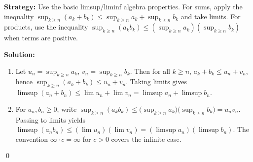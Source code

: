\noindent\textbf{Strategy:} Use the basic limsup/liminf algebra properties. For sums, apply the inequality \(\sup_{k\ge n}(a_k+b_k)\le \sup_{k\ge n} a_k + \sup_{k\ge n} b_k\) and take limits. For products, use the inequality \(\sup_{k\ge n}(a_k b_k)\le (\sup_{k\ge n} a_k)(\sup_{k\ge n} b_k)\) when terms are positive.

\bigskip\noindent\textbf{Solution:}
\begin{enumerate}[label=(\alph*)]
\item Let \(u_n=\sup_{k\ge n} a_k\), \(v_n=\sup_{k\ge n} b_k\). Then for all \(k\ge n\), \(a_k+b_k\le u_n+v_n\), hence \(\sup_{k\ge n}(a_k+b_k)\le u_n+v_n\). Taking limits gives \(\limsup(a_n+b_n)\le \lim u_n+\lim v_n=\limsup a_n+\limsup b_n\).
\item For \(a_n,b_n\ge 0\), write \(\sup_{k\ge n}(a_k b_k)\le \big(\sup_{k\ge n} a_k\big)\big(\sup_{k\ge n} b_k\big)=u_n v_n\). Passing to limits yields \(\limsup(a_n b_n)\le (\lim u_n)(\lim v_n)=(\limsup a_n)(\limsup b_n)\). The convention \(\infty\cdot c=\infty\) for \(c>0\) covers the infinite case.
\end{enumerate}\qed


